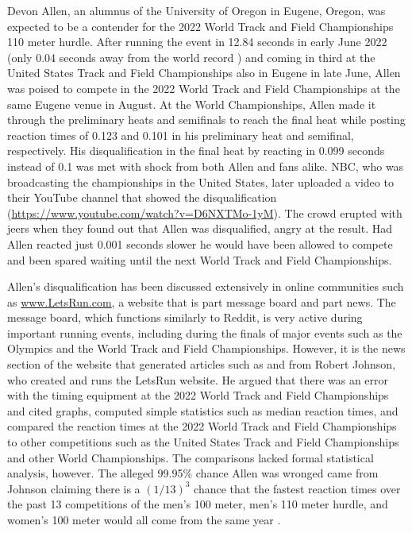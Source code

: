 \documentclass[12pt, letterpaper, titlepage]{article}
\begin{document}
Devon Allen, an alumnus of the University of Oregon in 
Eugene, Oregon, was
expected to be a contender for the 2022 World Track and Field Championships 110 
meter hurdle.  After running the event in 12.84 seconds in early June 2022 
(only 0.04 seconds away from the world record \citep{wa2022preview}) and coming 
in third at the United States Track and Field 
Championships also in Eugene in late June, Allen was poised to compete in the 
2022 World Track and Field Championships at the same Eugene venue in August.
At the World Championships, Allen made it through the preliminary
heats and semifinals to reach the final heat while posting reaction times of 
0.123 and 0.101 in his preliminary heat and semifinal, respectively.  
His disqualification in the final heat by reacting in 0.099 seconds instead of 
0.1 was met
with shock from both Allen and fans alike.  NBC, who was broadcasting the
championships in the United States, later uploaded a video to their YouTube
channel that showed the disqualification
(\url{https://www.youtube.com/watch?v=D6NXTMo-1yM}).
The crowd erupted with jeers
when they found out that Allen was disqualified, angry at the result.  Had Allen 
reacted just 0.001 seconds slower he would have been allowed to compete and been 
spared waiting until the next World Track and Field Championships.

Allen's disqualification has been discussed extensively in online communities
such as \url{www.LetsRun.com}, a website that is part message board and part
news. The message board,
which functions similarly to Reddit, is very active during important running
events, including during the finals of major events such as
the Olympics and the World Track and Field Championships.  However, it is the
news section of the website that generated articles such as \citet{johnson2022data}
and \citet{johnson2022was} from  Robert Johnson, who created and runs 
the LetsRun website.  He argued that there was an error
with the timing equipment at the 2022 World Track and Field Championships and
cited graphs, computed simple statistics such as median reaction times, and 
compared the reaction times at the 2022 World Track and Field Championships to 
other competitions
such as the United States Track and Field Championships and other World Championships.
The comparisons lacked formal statistical analysis, however. 
The alleged 99.95\% chance Allen was wronged 
came from Johnson claiming there is a $(1/13)^3$ chance that the fastest 
reaction times over the past 13 competitions of the men's 100 meter, men's 110 
meter hurdle, and women's 100 meter would all come from the same year 
\citep{johnson2022was}.
\end{document}
